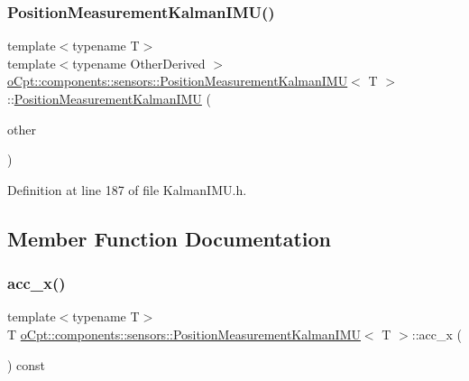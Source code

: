 \subsubsection{\texorpdfstring{Position\+Measurement\+Kalman\+I\+M\+U()}{PositionMeasurementKalmanIMU()}\hspace{0.1cm}{\footnotesize\ttfamily [2/2]}}
{\footnotesize\ttfamily template$<$typename T$>$ \\
template$<$typename Other\+Derived $>$ \\
\hyperlink{classo_cpt_1_1components_1_1sensors_1_1_position_measurement_kalman_i_m_u}{o\+Cpt\+::components\+::sensors\+::\+Position\+Measurement\+Kalman\+I\+MU}$<$ T $>$\+::\hyperlink{classo_cpt_1_1components_1_1sensors_1_1_position_measurement_kalman_i_m_u}{Position\+Measurement\+Kalman\+I\+MU} (\begin{DoxyParamCaption}\item[{const Eigen\+::\+Matrix\+Base$<$ Other\+Derived $>$ \&}]{other }\end{DoxyParamCaption})\hspace{0.3cm}{\ttfamily [inline]}}



Definition at line 187 of file Kalman\+I\+M\+U.\+h.



\subsection{Member Function Documentation}
\hypertarget{classo_cpt_1_1components_1_1sensors_1_1_position_measurement_kalman_i_m_u_a511c5c331629625c81e3c4e81ecd9128}{}\label{classo_cpt_1_1components_1_1sensors_1_1_position_measurement_kalman_i_m_u_a511c5c331629625c81e3c4e81ecd9128} 
\subsubsection{\texorpdfstring{acc\+\_\+x()}{acc\_x()}\hspace{0.1cm}{\footnotesize\ttfamily [1/2]}}
{\footnotesize\ttfamily template$<$typename T$>$ \\
T \hyperlink{classo_cpt_1_1components_1_1sensors_1_1_position_measurement_kalman_i_m_u}{o\+Cpt\+::components\+::sensors\+::\+Position\+Measurement\+Kalman\+I\+MU}$<$ T $>$\+::acc\+\_\+x (\begin{DoxyParamCaption}{ }\end{DoxyParamCaption}) const\hspace{0.3cm}{\ttfamily [inline]}}



